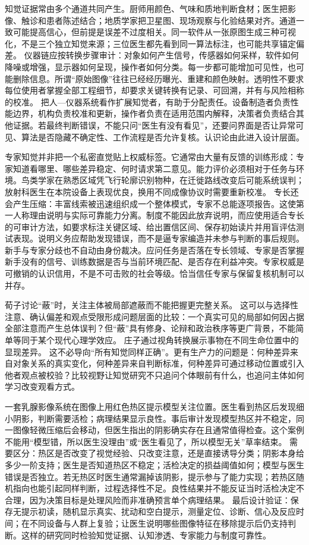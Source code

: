 知觉证据常由多个通道共同产生。厨师用颜色、气味和质地判断食材；医生把影像、触诊和患者陈述结合；地质学家把卫星图、现场观察与化验结果对齐。通道一致可能提高信心，但前提是误差不过度相关。同一软件从一张原图生成三种可视化，不是三个独立知觉来源；三位医生都先看到同一算法标注，也可能共享锚定偏差。 仪器链应按转换步骤审计：对象如何产生信号，传感器如何采样，软件如何降噪或增强，显示器如何呈现，操作者如何分类。每一步都可能增加可见性，也可能删除信息。所谓“原始图像”往往已经经历曝光、重建和颜色映射。透明性不要求每位使用者掌握全部工程细节，却要求关键转换有记录、可回溯，并有与风险相称的校准。 把人—仪器系统看作扩展知觉者，有助于分配责任。设备制造者负责性能边界，机构负责校准和更新，操作者负责在适用范围内解释，决策者负责结合其他证据。若最终判断错误，不能只问“医生有没有看见”，还要问界面是否让异常可见、算法是否隐藏不确定性、工作流程是否允许复核。认识论由此进入设计层面。

专家知觉并非把一个私密直觉贴上权威标签。它通常由大量有反馈的训练形成：专家知道看哪里、哪些差异稳定、何时请求第二意见。能力评价必须相对于任务与环境。鸟类学家在熟悉区域凭飞行轮廓识别物种，在迁徙路线改变后可能系统误判；放射科医生在本院设备上表现优良，换用不同成像协议时需要重新校准。 专长还会产生压缩：丰富线索被迅速组织成一个整体模式，专家不总能逐项报告。这使第一人称理由说明与实际可靠能力分离。制度不能因此放弃说明，而应使用适合专长的可审计方法，如要求标注关键区域、给出置信区间、保存初始读片并用盲评估测试表现。说明义务应帮助发现错误，而不是逼专家编造并未参与判断的事后规则。 新手与专家分歧也不自动由身份裁决。应问任务是否落在专长领域、专家是否掌握新手没有的信号、训练数据是否与当前环境匹配、是否存在利益冲突。专家权威是可撤销的认识信用，不是不可击败的社会等级。恰当信任专家与保留复核机制可以并存。

荀子讨论“蔽”时，关注主体被局部遮蔽而不能把握更完整关系。\parencite{xunzi2014} 这可以与选择性注意、确认偏差和观点受限形成问题层面的比较：一个真实可见的局部如何因占据全部注意而产生总体误判？但“蔽”具有修身、论辩和政治秩序等更广背景，不能简单等同于某个现代心理学效应。 庄子通过视角转换展示事物在不同生命位置中的显现差异。\parencite{zhuangzi2009} 这不必导向“所有知觉同样正确”。更有生产力的问题是：何种差异来自对象关系的真实变化，何种差异来自判断标准，何种差异可通过移动位置或引入他者观点被校验？比较视野让知觉研究不只追问个体眼前有什么，也追问主体如何学习改变观看方式。

一套乳腺影像系统在图像上用红色热区提示模型关注位置。医生看到热区后发现细小阴影，判断需要活检；病理结果显示良性。事后审计发现模型热区并不稳定，同一图像轻微压缩后会移动，但医生指出的阴影确实存在且通常值得检查。这个案例不能用“模型错，所以医生没理由”或“医生看见了，所以模型无关”草率结束。 需要区分：热区是否改变了视觉经验、只改变注意，还是直接诱导分类；阴影本身给多少一阶支持；医生是否知道热区不稳定；活检决定的损益阈值如何；模型与医生错误是否独立。若无热区时医生通常漏掉该阴影，提示参与了能力实现；若热区随机指向也能引起同样判断，过程选择性不足。良性结果并不能反证当时活检决定不合理，因为决策目标是处理风险而非准确预言单个病理结果。 最后设计验证：保存无提示初读，随机显示真实、扰动和空白提示，测量定位、诊断、信心及反应时间；在不同设备与人群上复验；让医生说明哪些图像特征在移除提示后仍支持判断。这样的研究同时检验知觉证据、认知渗透、专家能力与制度可靠性。

